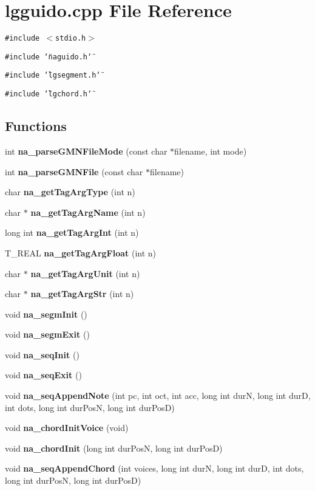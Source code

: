 \section{lgguido.cpp File Reference}
\label{lgguido_8cpp}
{\tt \#include $<$stdio.h$>$}\par
{\tt \#include \char`\"{}naguido.h\char`\"{}}\par
{\tt \#include \char`\"{}lgsegment.h\char`\"{}}\par
{\tt \#include \char`\"{}lgchord.h\char`\"{}}\par
\subsection*{Functions}
\begin{CompactItemize}
\item 
int {\bf na\_\-parse\-GMNFile\-Mode} (const char $\ast$filename, int mode)
\item 
int {\bf na\_\-parse\-GMNFile} (const char $\ast$filename)
\item 
char {\bf na\_\-get\-Tag\-Arg\-Type} (int n)
\item 
char $\ast$ {\bf na\_\-get\-Tag\-Arg\-Name} (int n)
\item 
long int {\bf na\_\-get\-Tag\-Arg\-Int} (int n)
\item 
T\_\-REAL {\bf na\_\-get\-Tag\-Arg\-Float} (int n)
\item 
char $\ast$ {\bf na\_\-get\-Tag\-Arg\-Unit} (int n)
\item 
char $\ast$ {\bf na\_\-get\-Tag\-Arg\-Str} (int n)
\item 
void {\bf na\_\-segm\-Init} ()
\item 
void {\bf na\_\-segm\-Exit} ()
\item 
void {\bf na\_\-seq\-Init} ()
\item 
void {\bf na\_\-seq\-Exit} ()
\item 
void {\bf na\_\-seq\-Append\-Note} (int pc, int oct, int acc, long int dur\-N, long int dur\-D, int dots, long int dur\-Pos\-N, long int dur\-Pos\-D)
\item 
void {\bf na\_\-chord\-Init\-Voice} (void)
\item 
void {\bf na\_\-chord\-Init} (long int dur\-Pos\-N, long int dur\-Pos\-D)
\item 
void {\bf na\_\-seq\-Append\-Chord} (int voices, long int dur\-N, long int dur\-D, int dots, long int dur\-Pos\-N, long int dur\-Pos\-D)
\item 

\end{CompactItemize}
